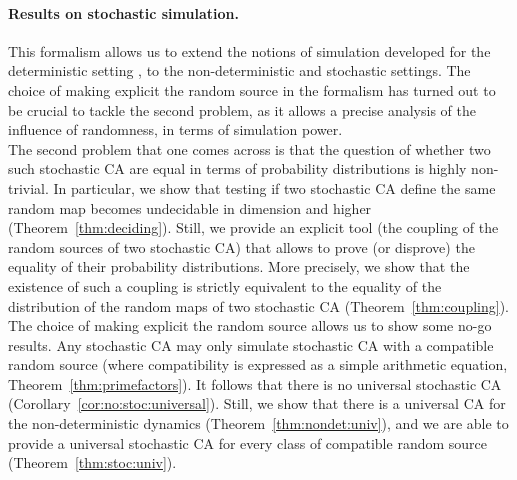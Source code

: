 \documentclass[submission]{fundam}
\begin{document}
\paragraph{Results on stochastic simulation.} This formalism allows us to extend the notions of simulation developed for the deterministic setting \cite{bulking1,bulking2}, to the non-deterministic and stochastic settings. The choice of making explicit the random source in the formalism has turned out to be crucial to tackle the second problem, as it allows a precise analysis of the influence of randomness, in terms of simulation power. \\
The second problem that one comes across is that the question of whether two such stochastic CA are equal in terms of probability distributions is highly non-trivial. In particular, we show that testing if two stochastic CA define the same random map becomes undecidable in dimension  and higher (Theorem~\ref{thm:deciding}). Still, we provide an explicit tool (the coupling of the random sources of two stochastic CA) that allows to prove (or disprove) the equality of their probability distributions. More precisely, we show that the existence of such a coupling is strictly equivalent to the equality of the distribution of the random maps of two stochastic CA (Theorem~\ref{thm:coupling}).\\
The choice of making explicit the random source allows us to show some no-go results. Any stochastic CA may only simulate stochastic CA with a compatible random source (where compatibility is expressed as a simple arithmetic equation, Theorem~\ref{thm:primefactors}). It follows that there is no universal stochastic CA (Corollary~\ref{cor:no:stoc:universal}). Still, we show that there is a universal CA for the non-deterministic dynamics (Theorem~\ref{thm:nondet:univ}), and we are able to provide a universal stochastic CA for every class of compatible random source (Theorem~\ref{thm:stoc:univ}).  
\end{document}
